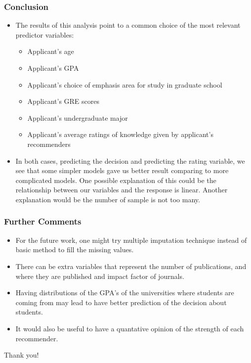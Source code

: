 \documentclass[11pt]{beamer}
\begin{document}
\begin{frame}
\frametitle{Conclusion}

\begin{itemize}
	\item The results of this analysis point to a common choice of the most relevant predictor variables:
	\begin{itemize}
		\item Applicant's age
		\item Applicant's GPA
		\item Applicant's choice of emphasis area for study in graduate school
		\item Applicant's GRE scores
		\item Applicant's undergraduate major
		\item Applicant's average ratings of knowledge given by applicant's recommenders
		\end{itemize} 
	\item In both cases, predicting the decision and predicting the rating variable, we see that some simpler models gave us better result comparing to more complicated models. One possible explanation of this could be the relationship between our variables and the response is linear. Another explanation would be the number of sample is not too many.
\end{itemize}
\end{frame}

\begin{frame}
\frametitle{Further Comments}

\begin{itemize}
\item For the future work, one might try multiple imputation technique instead of basic method to fill the missing values.
\pause 
\item There can be extra variables that represent the number of publications, and where they are published and impact factor of journals.

\pause
\item Having distributions of the GPA's of the universities where students are coming from may lead to have better prediction of the decision about students.
\pause
\item  It would also be useful to have a quantative opinion of the strength of  each recommender. 

\end{itemize}
\end{frame}


\begin{frame}
	\centering \Huge
	Thank you!
\end{frame}
\end{document}

